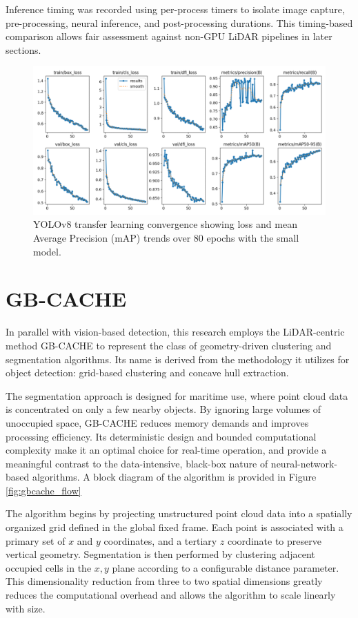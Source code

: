\documentclass{erauthesis}
\begin{document}
Inference timing was recorded using per-process timers to isolate image capture, pre-processing, neural inference, and post-processing durations.
This timing-based comparison allows fair assessment against non-GPU LiDAR pipelines in later sections.

\begin{figure}[htbp]
    \centering
    \includegraphics[width=0.85\linewidth]{Images/yolo/YOLO_training.png}
    \caption{YOLOv8 transfer learning convergence showing loss and mean Average Precision (mAP) trends over 80 epochs with the small model.}
    \label{fig:yolo_training_curve}
\end{figure}


\section{GB-CACHE} \label{gbcache}
%

In parallel with vision-based detection, this research employs the LiDAR-centric method GB-CACHE to represent the class of geometry-driven clustering and segmentation algorithms.
Its name is derived from the methodology it utilizes for object detection: grid-based clustering and concave hull extraction.

The segmentation approach is designed for maritime use, where point cloud data is concentrated on only a few nearby objects.
By ignoring large volumes of unoccupied space, GB-CACHE reduces memory demands and improves processing efficiency.
Its deterministic design and bounded computational complexity make it an optimal choice for real-time operation, and provide a meaningful contrast to the data-intensive, black-box nature of neural-network-based algorithms.
A block diagram of the algorithm is provided in Figure \ref{fig:gbcache_flow}

The algorithm begins by projecting unstructured point cloud data into a spatially organized grid defined in the global fixed frame.
Each point is associated with a primary set of $x$ and $y$ coordinates, and a tertiary $z$ coordinate to preserve vertical geometry.
Segmentation is then performed by clustering adjacent occupied cells in the $x,y$ plane according to a configurable distance parameter.
This dimensionality reduction from three to two spatial dimensions greatly reduces the computational overhead and allows the algorithm to scale linearly with size.
\end{document}
